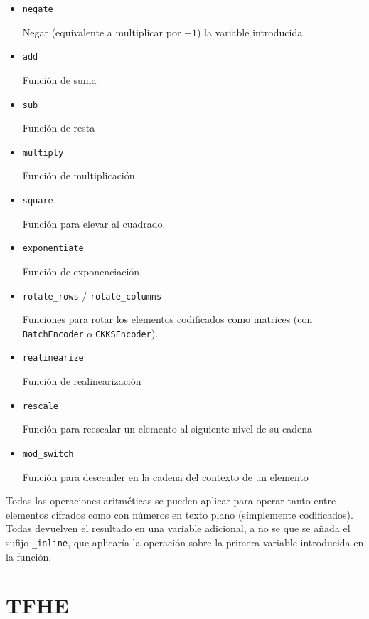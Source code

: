 \begin{itemize}
    \item \verb|negate|

    Negar (equivalente a multiplicar por $-1$) la variable introducida.

    \item \verb|add|

    Función de suma

    \item \verb|sub|

    Función de resta

    \item \verb|multiply|

    Función de multiplicación

    \item \verb|square|

    Función para elevar al cuadrado.

    \item \verb|exponentiate|

    Función de exponenciación.

    \item \verb|rotate_rows| /  \verb|rotate_columns|

    Funciones para rotar los elementos codificados como matrices (con \verb|BatchEncoder| o \verb|CKKSEncoder|).

    \item \verb|realinearize|

    Función de realinearización

    \item \verb|rescale|

    Función para reescalar un elemento al siguiente nivel de su cadena

    \item \verb|mod_switch|

    Función para descender en la cadena del contexto de un elemento

\end{itemize}

Todas las operaciones aritméticas se pueden aplicar para operar tanto entre elementos cifrados como con números en texto plano (símplemente codificados). Todas devuelven el resultado en una variable adicional, a no se que se añada el sufijo \verb|_inline|, que aplicaría la operación sobre la primera variable introducida en la función.

\section{TFHE}

